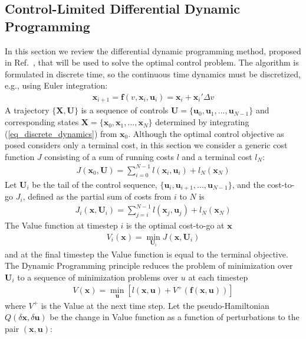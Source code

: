 \documentclass[journal ]{new-aiaa}
\newcommand{\state}{\ensuremath{\mathbf{x}}}
\newcommand{\control}{\ensuremath{\mathbf{u}}}
\newcommand{\State}{\ensuremath{\mathbf{X}}}
\newcommand{\Control}{\ensuremath{\mathbf{U}}}
\begin{document}
\subsection*{Control-Limited Differential Dynamic Programming}
In this section we review the differential dynamic programming method, proposed in Ref.~\cite{DDP_ControlLimited}, that will be used to solve the optimal control problem. 
The algorithm is formulated in discrete time, so the continuous time dynamics must be discretized, e.g., using Euler integration:
\begin{align}
\state_{i+1} = \mathbf{f}(v, \state_i,\control_i) = \state_i + \state_i'\Delta v \label{eq_discrete_dynamics}
\end{align}
A trajectory $\{\State,\Control\}$ is a sequence of controls $ \Control=\{\control_0,\control_1,...,\control_{N-1}\} $ and corresponding states $\State=\{\state_0,\state_1,...,\state_N\}$ determined by integrating (\ref{eq_discrete_dynamics}) from $\state_0$.
Although the optimal control objective as posed considers only a terminal cost, in this section we consider a generic cost function $J$ consisting of a sum of running costs $l$ and a terminal cost $l_N$:
\begin{align}
J(\state_0,\Control) = \sum_{i=0}^{N-1}l(\state_i,\control_i) + l_N(\state_N)
\end{align}
Let $\Control_i$ be the tail of the control sequence, $\{\control_i,\control_{i+1},...,\control_{N-1}\}$, and the cost-to-go $J_i$, defined as the partial sum of costs from $i$ to $N$ is
\begin{align}
J_i(\state,\Control_i) = \sum_{j=i}^{N-1}l(\state_j,\control_j) + l_N(\state_N)
\end{align}
The Value function at timestep $i$ is the optimal cost-to-go at \state
\begin{align}
V_i(\state) = \min_{\Control_i} J(\state, \Control_i)
\end{align}
and at the final timestep the Value function is equal to the terminal objective. The Dynamic Programming principle reduces the problem of minimization over $\Control_i$ to a sequence of minimization problems over $u$ at each timestep 
\begin{align}
V(\state) = \min_{\control}\left[l(\state,\control) + V^+(\mathbf{f}(\state,\control))\right] \label{eq_dynamic_programming}
\end{align}
where $V^+$ is the Value at the next time step.
Let the pseudo-Hamiltonian $Q(\delta\state,\delta\control)$ be the change in Value function as a function of perturbations to the pair $(\state,\control)$:
\end{document}
